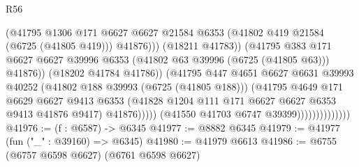 \begin{lexlean}{R56}
\begin{coremodule}
                                              (@41795
                                                @1306
                                                @171
                                                @6627
                                                @6627
                                                @21584
                                                @6353
                                                (@41802 @419 @21584 (@6725 (@41805 @419)))
                                                @41876)))
                                          (@18211 @41783))
                                        (@41795
                                          @383
                                          @171
                                          @6627
                                          @6627
                                          @39996
                                          @6353
                                          (@41802 @63 @39996 (@6725 (@41805 @63)))
                                          @41876))
                                      (@18202 @41784 @41786))
                                    (@41795
                                      @447
                                      @4651
                                      @6627
                                      @6631
                                      @39993
                                      @40252
                                      (@41802 @188 @39993 (@6725 (@41805 @188)))
                                      (@41795
                                        @4649
                                        @171
                                        @6629
                                        @6627
                                        @9413
                                        @6353
                                        (@41828
                                          @1204
                                          @111
                                          @171
                                          @6627
                                          @6627
                                          @6353
                                          @9413
                                          @41876
                                          @9417)
                                        @41876)))))
                              (@41550 @41703 @6747 @39399))))))))))))))
@41976 := (f : @6587) -> @6345
@41977 := @8882 @6345
@41979 := @41977 (fun ("_" : @39160) => @6345)
@41980 := @41979 @6613
@41986 := @6755 (@6757 @6598 @6627) (@6761 @6598 @6627)

\end{coremodule}
\end{lexlean}
